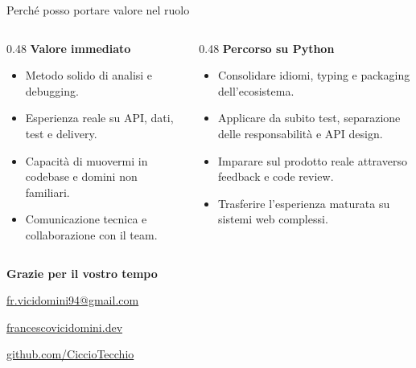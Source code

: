 \documentclass[aspectratio=169,11pt]{beamer}
\begin{document}
\begin{frame}{Perché posso portare valore nel ruolo}
  \begin{columns}[T,onlytextwidth]
    \begin{column}{0.48\textwidth}
      \textbf{Valore immediato}
      \begin{itemize}
        \item Metodo solido di analisi e debugging.
        \item Esperienza reale su API, dati, test e delivery.
        \item Capacità di muovermi in codebase e domini non familiari.
        \item Comunicazione tecnica e collaborazione con il team.
      \end{itemize}
    \end{column}
    \begin{column}{0.48\textwidth}
      \textbf{Percorso su Python}
      \begin{itemize}
        \item Consolidare idiomi, typing e packaging dell'ecosistema.
        \item Applicare da subito test, separazione delle responsabilità e API design.
        \item Imparare sul prodotto reale attraverso feedback e code review.
        \item Trasferire l'esperienza maturata su sistemi web complessi.
      \end{itemize}
    \end{column}
  \end{columns}
\end{frame}

{
  \begin{frame}[plain]
    \vfill
    {\color{white}\LARGE\bfseries Grazie per il vostro tempo\par}
    \vspace{0.45cm}
    {\color{white}
      \href{mailto:fr.vicidomini94@gmail.com}{fr.vicidomini94@gmail.com}\par
      \href{https://francescovicidomini.dev/}{francescovicidomini.dev}\par
      \href{https://github.com/CiccioTecchio}{github.com/CiccioTecchio}
    }
    \vfill
  \end{frame}
}
\end{document}
